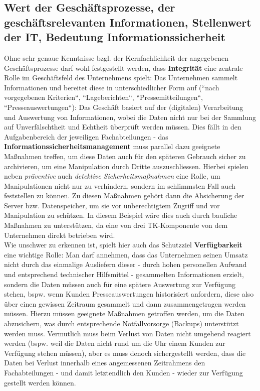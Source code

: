 \subsection*{Wert der Geschäftsprozesse, der geschäftsrelevanten Informationen, Stellenwert der IT, Bedeutung Informationssicherheit}

Ohne sehr genaue Kenntnisse bzgl. der Kernfachlichkeit der angegebenen Geschäftsprozesse darf wohl festgestellt werden, dass \textbf{Integrität} eine zentrale Rolle im Geschäftsfeld des Unternehmens spielt: Das Unternehmen sammelt Informationen und bereitet diese in unterschiedlicher Form auf (``nach vorgegebenen Kriterien``, ``Lageberichten``, ``Pressemitteilungen``, ``Presseauswertungen``):
Das Geschäft basiert auf der (digitalen) Verarbeitung und Auswertung von Informationen, wobei die Daten nicht nur bei der Sammlung auf Unverfälschtheit und Echtheit überprüft werden müssen.
Dies fällt in den Aufgabenbereich der jeweiligen Fachabteilungen - das \textbf{Informationssicherheitsmanagement} muss parallel dazu geeignete Maßnahmen treffen, um diese Daten auch für den späteren Gebrauch sicher zu archivieren, um eine Manipulation durch Dritte auszuschliessen.
Hierbei spielen neben \textit{präventive} auch \textit{detektive Sicherheitsmaßnahmen} eine Rolle, um Manipulationen nicht nur zu verhindern, sondern im schlimmsten Fall auch feststellen zu können.
Zu diesen Maßnahmen gehört dann die Absicherung der Server bzw. Datenspeicher, um sie vor unberechtigtem Zugriff und vor Manipulation zu schützen.
In diesem Beispiel wäre dies auch durch  bauliche Maßnahmen  zu unterstützen, da eine von drei TK-Komponente von dem Unternehmen direkt betrieben wird.\\


Wie unschwer zu erkennen ist, spielt hier auch das Schutzziel \textbf{Verfügbarkeit} eine wichtige Rolle: Man darf annehmen, dass das Unternehmen seinen Umsatz nicht durch das einmalige Ausliefern dieser - durch hohen personellen Aufwand und entsprechend technischer Hilfsmittel - gesammelten Informationen erzielt, sondern die Daten müssen auch für eine spätere Auswertung zur Verfügung stehen, bspw. wenn Kunden Presseauswertungen historisiert anfordern, diese also über einen gewissen Zeitraum gesammelt und dann zusammengetragen werden müssen.
Hierzu müssen geeignete Maßnahmen getroffen werden, um die Daten abzusichern, was durch entsprechende Notfallvorsorge (Backups) unterstützt werden muss.
Vermutlich muss beim Verlust von Daten nicht umgehend reagiert werden (bspw. weil die Daten nicht rund um die Uhr einem Kunden zur Verfügung stehen müssen), aber es muss denoch sichergestellt werden, dass die Daten bei Verlust innerhalb eines angemessenen Zeitrahmens den Fachabteilungen - und damit letztendlich den Kunden - wieder zur Verfügung gestellt werden können.\\


